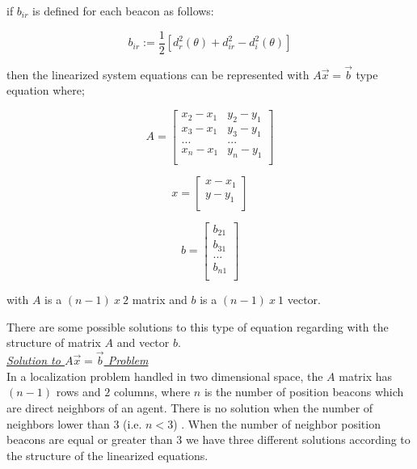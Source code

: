 if $b_{ir}$ is defined for each beacon as follows:

\begin{equation}
b_{ir} := \frac{1}{2}[d_r^2(\theta) + d_{ir}^2 - d_i^2(\theta)]
\end{equation}

then the linearized system equations can be represented with $A\vec{x} = \vec{b}$ type equation where;

\begin{equation}
A = \begin{bmatrix}
x_2 - x_1 & y_2 - y_1\\
x_3 - x_1 & y_3 - y_1\\
...       & ...      \\
x_n - x_1 & y_n - y_1\\
\end{bmatrix}				
\end{equation}

\begin{equation}
x = \begin{bmatrix}
x - x_1\\
y - y_1\\
\end{bmatrix}
\end{equation}

\begin{equation}
b = \begin{bmatrix}
b_{21}\\
b_{31}\\
... \\
b_{n1}\\
\end{bmatrix}
\end{equation}

with $A$ is a $(n-1)\ x\ 2$ matrix and $b$ is a $(n-1)\ x\ 1$ vector.

There are some possible solutions to this type of equation regarding with the structure of matrix $A$ and vector $b$.\\

\newpage
\underline {\textit{Solution to $A\vec{x} = \vec{b}$ Problem}}\\
In a localization problem handled in two dimensional space, the $A$ matrix has $(n-1)$ rows and $2$ columns, where $n$ is the number of position beacons which are direct neighbors of an agent. There is no solution when the number of neighbors lower than $3$ (i.e. $n<3$) \cite{22}. When the number of neighbor position beacons are equal or greater than $3$ we have three different solutions according to the structure of the linearized equations.

